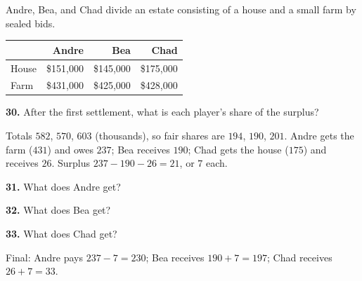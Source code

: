 \documentclass[12pt]{ximera}
\begin{document}
\begin{problem}
Andre, Bea, and Chad divide an estate consisting of a house and a small farm by sealed
bids.
\begin{center}
\begin{tabular}{l|rrr}
 & Andre & Bea & Chad\\\hline
House & \$151,000 & \$145,000 & \$175,000\\
Farm & \$431,000 & \$425,000 & \$428,000
\end{tabular}
\end{center}

\begin{prompt}
\textbf{30.} After the first settlement, what is each player's share of the surplus?
\begin{multipleChoice}
\end{multipleChoice}
\begin{feedback}
Totals $582$, $570$, $603$ (thousands), so fair shares are $194$, $190$, $201$. Andre gets the farm ($431$) and owes $237$; Bea receives $190$; Chad gets the house ($175$) and receives $26$. Surplus $237-190-26=21$, or $7$ each.
\end{feedback}
\end{prompt}

\begin{prompt}
\textbf{31.} What does Andre get?
\begin{multipleChoice}
\end{multipleChoice}
\end{prompt}

\begin{prompt}
\textbf{32.} What does Bea get?
\begin{multipleChoice}
\end{multipleChoice}
\end{prompt}

\begin{prompt}
\textbf{33.} What does Chad get?
\begin{multipleChoice}
\end{multipleChoice}
\begin{feedback}
Final: Andre pays $237-7=230$; Bea receives $190+7=197$; Chad receives $26+7=33$.
\end{feedback}
\end{prompt}
\end{problem}
\end{document}

